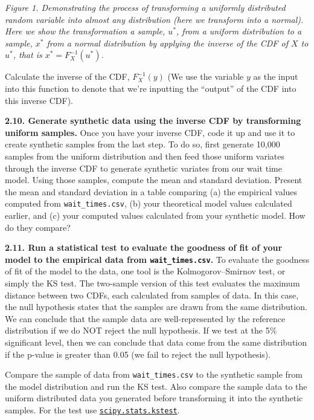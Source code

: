 \documentclass[
  letterpaper,
  DIV=11,
  numbers=noendperiod]{scrartcl}
\begin{document}
\emph{Figure 1. Demonstrating the process of transforming a uniformly
distributed random variable into almost any distribution (here we
transform into a normal). Here we show the transformation a sample,
\(u^{\ast}\), from a uniform distribution to a sample, \(x^{\ast}\) from
a normal distribution by applying the inverse of the CDF of \(X\) to
\(u^{\ast}\), that is \(x^{\ast} = F_X^{-1}(u^{\ast})\).}

Calculate the inverse of the CDF, \(F_X^{-1}(y)\) (We use the variable
\(y\) as the input into this function to denote that we're inputting the
``output'' of the CDF into this inverse CDF).

\textbf{2.10. Generate synthetic data using the inverse CDF by
transforming uniform samples.} Once you have your inverse CDF, code it
up and use it to create synthetic samples from the last step. To do so,
first generate 10,000 samples from the uniform distribution and then
feed those uniform variates through the inverse CDF to generate
synthetic variates from our wait time model. Using those samples,
compute the mean and standard deviation. Present the mean and standard
deviation in a table comparing (a) the empirical values computed from
\texttt{wait\_times.csv}, (b) your theoretical model values calculated
earlier, and (c) your computed values calculated from your synthetic
model. How do they compare?

\textbf{2.11. Run a statistical test to evaluate the goodness of fit of
your model to the empirical data from \texttt{wait\_times.csv}.} To
evaluate the goodness of fit of the model to the data, one tool is the
Kolmogorov--Smirnov test, or simply the KS test. The two-sample version
of this test evaluates the maximum distance between two CDFs, each
calculated from samples of data. In this case, the null hypothesis
states that the samples are drawn from the same distribution. We can
conclude that the sample data are well-represented by the reference
distribution if we do NOT reject the null hypothesis. If we test at the
5\% significant level, then we can conclude that data come from the same
distribution if the p-value is greater than 0.05 (we fail to reject the
null hypothesis).

Compare the sample of data from \texttt{wait\_times.csv} to the
synthetic sample from the model distribution and run the KS test. Also
compare the sample data to the uniform distributed data you generated
before transforming it into the synthetic samples. For the test use
\href{https://docs.scipy.org/doc/scipy/reference/generated/scipy.stats.kstest.html}{\texttt{scipy.stats.kstest}}.
\end{document}
